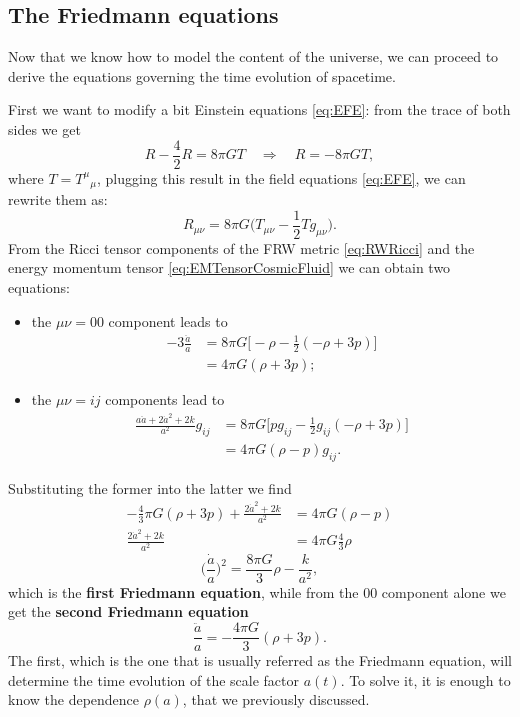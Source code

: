 \subsection{The Friedmann equations}
Now that we know how to model the content of the universe, we can proceed to derive the equations governing the time evolution of spacetime.

First we want to modify a bit Einstein equations \eqref{eq:EFE}: from the trace of both sides we get
\begin{equation*}
    R-\frac{4}{2}R=8\pi GT\quad\Rightarrow\quad R=-8\pi GT,
\end{equation*}
where $T=T^\mu\phantom{}_\mu$, plugging this result in the field equations \eqref{eq:EFE}, we can rewrite them as:\begin{equation*}
    R_{\mu\nu}=8\pi G\bigg(T_{\mu\nu}-\frac{1}{2}Tg_{\mu\nu}\bigg).
\end{equation*}
From the Ricci tensor components of the FRW metric \eqref{eq:RWRicci} and the energy momentum tensor \eqref{eq:EMTensorCosmicFluid} we can obtain two equations:
\begin{itemize}
    \item the $\mu\nu=00$ component leads to
    \begin{align*}
        -3\frac{\ddot a}{a}&=8\pi G\bigg[-\rho-\frac{1}{2}(-\rho+3p)\bigg]\\&=4\pi G(\rho+3p);
    \end{align*}
    \item the $\mu\nu=ij$ components lead to
    \begin{align*}
        \frac{a\ddot a+2\dot a^2+2k}{a^2}g_{ij}&=8\pi G\bigg[pg_{ij}-\frac{1}{2}g_{ij}(-\rho+3p)\bigg]\\&=4\pi G(\rho-p)g_{ij}.
    \end{align*}
\end{itemize}
Substituting the former into the latter we find
\begin{align}
   -\frac{4}{3}\pi G(\rho+3p) +\frac{2\dot a^2+2k}{a^2}&=4\pi G(\rho-p)\nonumber\\\frac{2\dot a^2+2k}{a^2}&=4\pi G\frac{4}{3}\rho\nonumber
\end{align}
\begin{equation}
    \boxed{\bigg(\frac{\dot a }{a}\bigg)^2=\frac{8\pi G}{3}\rho-\frac{k}{a^2}}\label{eq:Friedmann1},
\end{equation}
which is the \textbf{first Friedmann equation}, while from the $00$ component alone we get the \textbf{second Friedmann equation}
\begin{equation}
    \label{eq:Friedmann2}\boxed{\frac{\ddot a}{a}=-\frac{4\pi G}{3}(\rho+3p)}.
\end{equation}
The first, which is the one that is usually referred as the Friedmann equation, will determine the time evolution of the scale factor $a(t)$. To solve it, it is enough to know the dependence $\rho(a)$, that we previously discussed.

